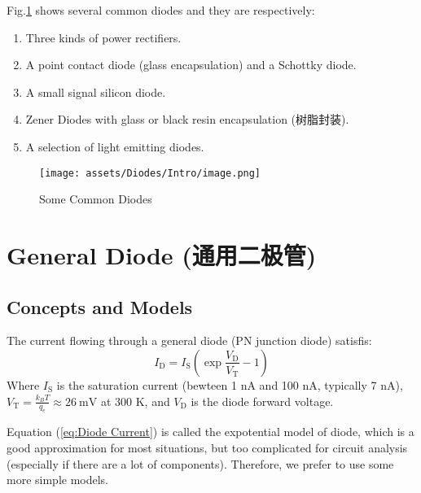 \documentclass[UTF8]{report}
\def\mV{\ \mathrm{mV}}
\begin{document}
\begin{center}
\noindent\begin{minipage}{0.63\columnwidth}
    Fig.\ref{Some Common Diodes} shows several common diodes and they are respectively:
    \begin{enumerate}
    \item Three kinds of power rectifiers.
    \item A point contact diode (glass encapsulation) and a Schottky diode.
    \item A small signal silicon diode.
    \item Zener Diodes with glass or black resin encapsulation (树脂封装).
    \item A selection of light emitting diodes.
    \end{enumerate}
\end{minipage}\hfill\begin{minipage}{0.3\columnwidth}
    \begin{figure}[H]\centering
        \texttt{[image: assets/Diodes/Intro/image.png]}
        \caption{Some Common Diodes}
        \label{Some Common Diodes}
    \end{figure}
    
\end{minipage}\end{center}




\section{General Diode (通用二极管)}

\subsection{Concepts and Models}

The current flowing through a general diode (PN junction diode) satisfis:
\begin{equation}\label{eq:Diode Current}
I_{\text{D}} = I_\text{S} \left( \exp \frac{V_\text{D}}{V_\text{T}} - 1 \right)
\end{equation}
Where $I_\text{S}$ is the saturation current (bewteen 1 nA and 100 nA, typically 7 nA), $V_\text{T} = \frac{k_BT}{q_e} \approx 26 \mV$ at 300 K, and $V_\text{D}$ is the diode forward voltage.

Equation (\ref{eq:Diode Current}) is called the expotential model of diode, which is a good approximation for most situations, but too complicated for circuit analysis (especially if there are a lot of components). Therefore, we prefer to use some more simple models. 
\end{document}
